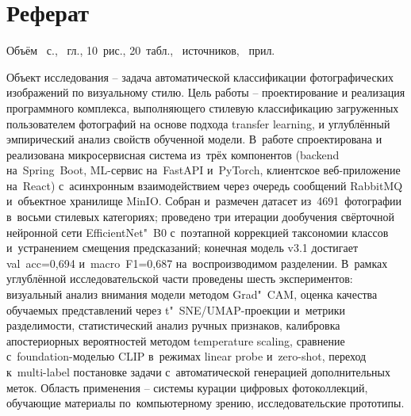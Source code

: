 \documentclass[a4paper,12pt]{diplom}
\begin{document}
\maketitle

\chapter*{Реферат}

Объём ~с., ~гл., 10~рис.,
20~табл., ~источников, ~прил.

\medskip


\medskip

Объект исследования -- задача автоматической классификации фотографических изображений по визуальному стилю.
Цель работы -- проектирование и реализация программного комплекса, выполняющего стилевую классификацию загруженных пользователем фотографий на основе подхода transfer learning, и углублённый эмпирический анализ свойств обученной модели.
В~работе спроектирована и реализована микросервисная система из~трёх компонентов (backend на~Spring~Boot, ML-сервис на~FastAPI и~PyTorch, клиентское веб-приложение на~React) с~асинхронным взаимодействием через очередь сообщений RabbitMQ и~объектное хранилище MinIO. Собран и~размечен датасет из~4691~фотографии в~восьми стилевых категориях; проведено три итерации дообучения свёрточной нейронной сети EfficientNet"~B0 с~поэтапной коррекцией таксономии классов и~устранением смещения предсказаний; конечная модель v3.1 достигает val~acc=0{,}694 и~macro~F1=0{,}687 на~воспроизводимом разделении.
В~рамках углублённой исследовательской части проведены шесть экспериментов: визуальный анализ внимания модели методом Grad"~CAM, оценка качества обучаемых представлений через t"~SNE/UMAP-проекции и~метрики разделимости, статистический анализ ручных признаков, калибровка апостериорных вероятностей методом temperature scaling, сравнение с~foundation-моделью CLIP в~режимах linear probe и~zero-shot, переход к~multi-label постановке задачи с~автоматической генерацией дополнительных меток.
Область применения -- системы курации цифровых фотоколлекций, обучающие материалы по~компьютерному зрению, исследовательские прототипы.
\end{document}
